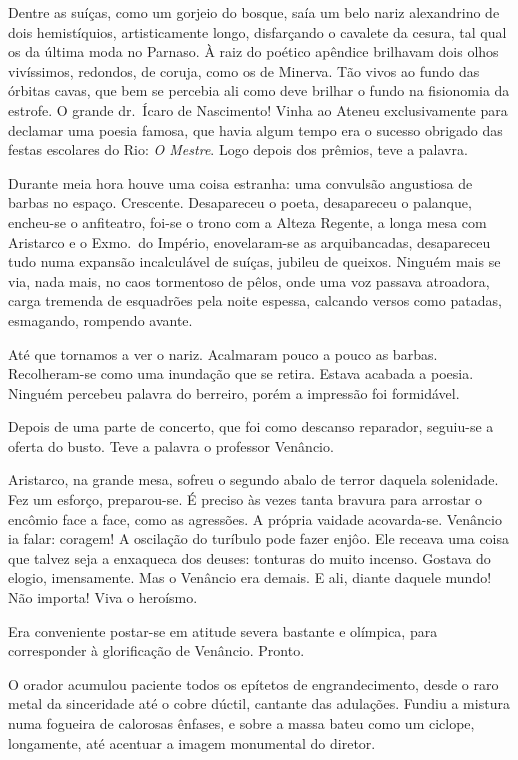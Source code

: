 Dentre as suíças, como um gorjeio do bosque, saía um belo nariz
alexandrino de dois hemistíquios, artisticamente longo, disfarçando o
cavalete da cesura, tal qual os da última moda no Parnaso. À raiz do
poético apêndice brilhavam dois olhos vivíssimos, redondos, de coruja,
como os de Minerva. Tão vivos ao fundo das órbitas cavas, que bem se
percebia ali como deve brilhar o fundo na fisionomia da estrofe. O
grande dr.~Ícaro de Nascimento! Vinha ao Ateneu exclusivamente para
declamar uma poesia famosa, que havia algum tempo era o sucesso
obrigado das festas escolares do Rio: \textit{O Mestre}. Logo depois dos
prêmios, teve a palavra.

Durante meia hora houve uma coisa estranha: uma convulsão angustiosa de
barbas no espaço. Crescente. Desapareceu o poeta, desapareceu o
palanque, encheu{}-se o anfiteatro, foi{}-se o trono com a Alteza
Regente, a longa mesa com Aristarco e o Exmo.~do Império,
enovelaram{}-se as arquibancadas, desapareceu tudo numa expansão
incalculável de suíças, jubileu de queixos. Ninguém mais se via, nada
mais, no caos tormentoso de pêlos, onde uma voz passava atroadora,
carga tremenda de esquadrões pela noite espessa, calcando versos como
patadas, esmagando, rompendo avante. 


Até que tornamos a ver o nariz.
Acalmaram pouco a pouco as barbas. Recolheram{}-se como uma inundação
que se retira. Estava acabada a poesia. Ninguém percebeu palavra do
berreiro, porém a impressão foi formidável. 

Depois de uma parte de
concerto, que foi como descanso reparador, seguiu{}-se a oferta do
busto. Teve a palavra o professor Venâncio. 

Aristarco, na grande mesa,
sofreu o segundo abalo de terror daquela solenidade. Fez um esforço,
preparou{}-se. É preciso às vezes tanta bravura para arrostar o encômio
face a face, como as agressões. A própria vaidade acovarda{}-se.
Venâncio ia falar: coragem! A oscilação do turíbulo pode fazer enjôo.
Ele receava uma coisa que talvez seja a enxaqueca dos deuses: tonturas
do muito incenso. Gostava do elogio, imensamente. Mas o Venâncio era
demais. E ali, diante daquele mundo! Não importa! Viva o heroísmo. 

Era conveniente postar{}-se em atitude severa bastante e olímpica, para
corresponder à glorificação de Venâncio. Pronto. 

O orador acumulou
paciente todos os epítetos de engrandecimento, desde o raro metal da
sinceridade até o cobre dúctil, cantante das adulações. Fundiu a
mistura numa fogueira de calorosas ênfases, e sobre a massa bateu como
um ciclope, longamente, até acentuar a imagem monumental do diretor.

